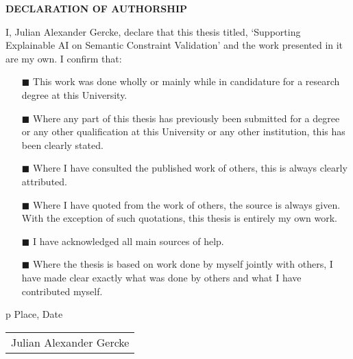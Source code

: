 \pagestyle{empty} 
\leavevmode%
\vspace*{\fill}\noindent
\begin{center}
  \textbf{DECLARATION OF AUTHORSHIP}
\end{center}

I, Julian Alexander Gercke, declare that this thesis titled, `Supporting Explainable AI on Semantic Constraint Validation' and the work presented in it are my own. I confirm that:

\begin{itemize} 
\item[\tiny{$\blacksquare$}] This work was done wholly or mainly while in candidature for a research degree at this University.
 
\item[\tiny{$\blacksquare$}] Where any part of this thesis has previously been submitted for a degree or any other qualification at this University or any other institution, this has been clearly stated.
 
\item[\tiny{$\blacksquare$}] Where I have consulted the published work of others, this is always clearly attributed.
 
\item[\tiny{$\blacksquare$}] Where I have quoted from the work of others, the source is always given. With the exception of such quotations, this thesis is entirely my own work.
 
\item[\tiny{$\blacksquare$}] I have acknowledged all main sources of help.
 
\item[\tiny{$\blacksquare$}] Where the thesis is based on work done by myself jointly with others, I have made clear exactly what was done by others and what I have contributed myself.
\\
\end{itemize}
\vspace{1cm}
\newlength\us
\settowidth{\us}{-~~~~~~Julian Alexander Gercke~~~~~~-}
\begin{minipage}{0.5\linewidth}
    \centering
    \begin{tabular}{p{\us}}\hline
    \centering\footnotesize Place, Date
    \end{tabular}
\end{minipage}
\begin{minipage}{0.5\linewidth}
    \centering
    \begin{tabular}{p{\us}}\hline
    \centering\footnotesize Julian Alexander Gercke
    \end{tabular}
\end{minipage}


\hfill\strut
\vspace*{\fill}